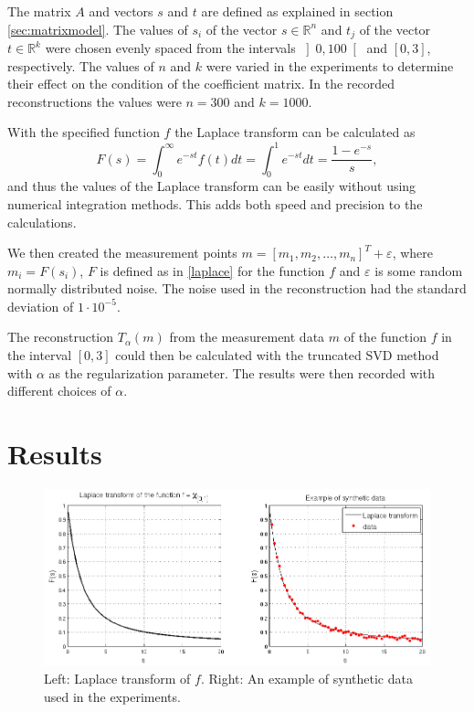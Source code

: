 \documentclass[12pt,a4]{article}
\newcommand{\R}{{\mathbb R}}
\newcommand{\eps}{\varepsilon}
\begin{document}
The matrix $A$ and vectors $s$ and $t$ are defined as explained in section \ref{sec:matrixmodel}. The values of $s_i$ of the vector $s \in \R^n$ and $t_j$ of the vector $t \in \R^k$ were chosen evenly spaced from the intervals $\left] 0, 100 \right[$ and $\left[ 0,3 \right]$, respectively. The values of $n$ and $k$ were varied in the experiments to determine their effect on the condition of the coefficient matrix. In the recorded reconstructions the values were $n = 300$ and $k = 1000$.

With the specified function $f$ the Laplace transform can be calculated as
\begin{equation}
F(s) = \int_0^{\infty} e^{-st} f(t) dt
     = \int_0^1 e^{-st} dt
     = \frac{1 - e^{-s}}{s},
\end{equation}
and thus the values of the Laplace transform can be easily without using numerical integration methods. This adds both speed and precision to the calculations.

We then created the measurement points $m = [m_1, m_2, \ldots, m_n]^T + \eps$, where $m_i = F(s_i)$, $F$ is defined as in \eqref{laplace} for the function $f$ and $\eps$ is some random normally distributed noise. The noise used in the reconstruction had the standard deviation of $1 \cdot 10^{-5}$.

The reconstruction $T_\alpha(m)$ from the measurement data $m$ of the function $f$ in the interval $\left[0,3\right]$ could then be calculated with the truncated SVD method with $\alpha$ as the regularization parameter. The results were then recorded with different choices of $\alpha$.



\section{Results}\label{sec:results}

\begin{figure}[t]
\begin{center}
\includegraphics[scale=.5]{img/laplace_data.png}
\end{center}
\caption{Left: Laplace transform of $f$. Right: An example of synthetic data used in the experiments.}
\label{fig:laplace}
\end{figure}
\end{document}
